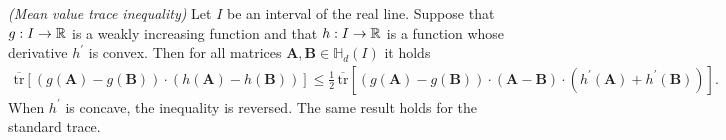 \begin{lemma}
  \emph{(Mean value trace inequality)}
  Let 
  $I$
  be an interval of the real line. Suppose that
  $
    g:
    I \to \mathbb{R}
  $
  is a weakly increasing function and that 
  $
    h:
    I \to \mathbb{R}
  $
  is a function whose derivative $h^{'}$ is convex.
  Then for all matrices 
  $
    \mathbf{A}
    ,
    \mathbf{B}
    \in 
    \mathbb{H}_d(I)
  $
  it holds
  \begin{gather}
    \overline{\mathrm{tr}}
    [
    (
      g(\mathbf{A}) - g(\mathbf{B})
    )
    \cdot
    (
      h(\mathbf{A}) - h(\mathbf{B})
    )
    ]
    \le
    \frac{1}{2}
    \,
    \overline{\mathrm{tr}}
    [
    (
      g(\mathbf{A}) - g(\mathbf{B})
    )
    \cdot
    (
    \mathbf{A}
    -
    \mathbf{B}
    )
    \cdot
    (
    h^{'}(\mathbf{A}) + h^{'}(\mathbf{B})
    )
    ]
    .
  \end{gather}
  When $h^{'}$ is concave, the inequality is reversed. The same result holds for the standard trace.
\end{lemma}
